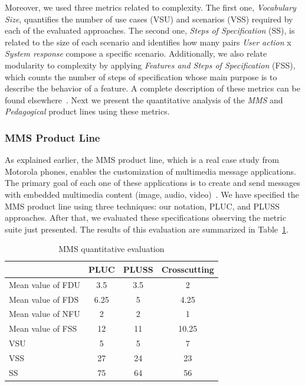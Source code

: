 \documentclass{acm_proc_article-sp}
\begin{document}
Moreover, we used three metrics related to complexity.
The first one, \emph{Vocabulary Size}, quantifies the number of use
cases (VSU) and scenarios (VSS) required by each of the evaluated
approaches. The second one, \emph{Steps of Specification}
(SS), is related to the size of each scenario and identifies
how many pairs \emph{User action} x \emph{System response} compose a
specific scenario. Additionally, we also relate modularity to
complexity by applying \emph{Features and Steps of Specification}
(FSS), which counts the number of steps of specification
whose main purpose is to describe the behavior of a feature. 
A complete description of these metrics can be found elsewhere~\cite{rbonifacio-ea-2008}. Next we 
present the quantitative analysis of the \emph{MMS} and \emph{Pedagogical} product lines using these metrics.

\subsubsection{MMS Product Line}

As explained earlier, the MMS product line, which is a real case study from Motorola phones, enables the customization of 
multimedia message applications. The primary goal of each one of these applications is to create and 
send messages with embedded multimedia content (image, audio, video)~\cite{rbonifacio-ea-2008}. 
We have specified the MMS product line using three techniques: our notation, PLUC, and PLUSS approaches. After that, we evaluated these specifications observing the metric suite just presented. The results of this evaluation are summarized in Table~\ref{tab:metrics}. 

\begin{table}[htb]
\centering
\caption{MMS quantitative evaluation}
\label{tab:metrics}
\begin{small}
\begin{tabular}{lccc} \hline
					& PLUC 	& PLUSS 	& Crosscutting	\\ \hline
Mean value of FDU 		& 3.5	& 3.5	& 2		\\
Mean value of FDS 		& 6.25	& 5		& 4.25	\\
Mean value of NFU 		& 2		& 2		& 1		\\
Mean value of FSS 		&12		& 11		& 10.25	\\ 
VSU 					& 5		& 5		& 7		\\
VSS 					& 27		& 24		& 23		\\
SS 					& 75		& 64		& 56		\\	\hline
\end{tabular}
\end{small}
\end{table}
\end{document}

